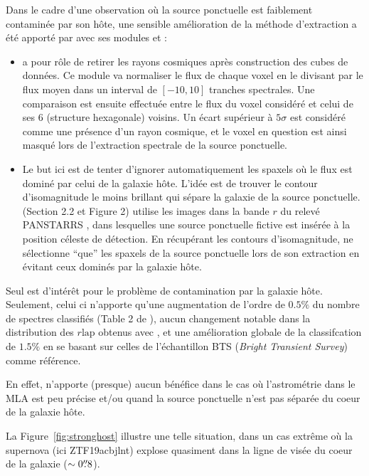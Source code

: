 \documentclass[../main/main.tex]{subfiles}
\begin{document}
Dans le cadre d'une observation où la source ponctuelle est faiblement
contaminée par son hôte, une sensible amélioration
de la méthode d'extraction a été apporté par \citet{Kimcontsep} avec ses
modules  et :

\begin{itemize}[label=$\bullet$]
\itemsep0em 
\item \textbf{} a pour rôle de retirer
les rayons cosmiques après construction des cubes de données. Ce module va
normaliser le flux de chaque voxel en le divisant par le flux moyen dans
un interval de $[-10,10]$ tranches spectrales. Une
comparaison est ensuite effectuée entre le flux du voxel considéré et celui de ses $6$
(structure hexagonale)
voisins. Un écart supérieur à $5\sigma$ est considéré comme une présence
d'un rayon cosmique, et le voxel en question est ainsi masqué lors de
l'extraction spectrale de la source ponctuelle.
\item \textbf{} Le but ici est de tenter d'ignorer
  automatiquement les spaxels où le flux est dominé par celui de la
  galaxie hôte. L'idée est de trouver le contour d'isomagnitude le moins
  brillant qui sépare la galaxie de la source
  ponctuelle. \citet{Kimcontsep} (Section 2.2 et Figure 2) utilise les images dans
  la bande $r$ du relevé PANSTARRS \citep{ChambersPanstarrs}, dans
  lesquelles une source ponctuelle fictive est insérée à
  la position céleste de détection. En récupérant les
  contours d'isomagnitude,  ne sélectionne ``que'' les spaxels
  de la source ponctuelle lors de son extraction en évitant ceux dominés
  par la
  galaxie hôte.
\end{itemize}

Seul  est d'intérêt pour le problème de contamination par
la galaxie hôte. Seulement, celui ci n'apporte qu'une augmentation de
l'ordre de $0.5\%$ du nombre de spectres classifiés (Table 2 de
\citet{Kimcontsep}), aucun changement notable dans la distribution des
$r\text{lap}$ obtenus avec , et une amélioration globale de la
classifcation de $1.5\%$ en se basant sur celles de l'échantillon BTS
(\textit{Bright Transient Survey}) comme référence.

En effet,  n'apporte (presque) aucun bénéfice dans le cas où
l'astrométrie dans le MLA est peu précise et/ou quand la source ponctuelle n'est pas
séparée du coeur de la galaxie hôte.

La Figure~\ref{fig:stronghost} illustre une telle situation, dans un cas
extrême où la supernova (ici ZTF19acbjlnt) explose quasiment dans la ligne de visée du
coeur de la galaxie ($\sim0\overset{\prime\prime}{.}8$).
\end{document}
